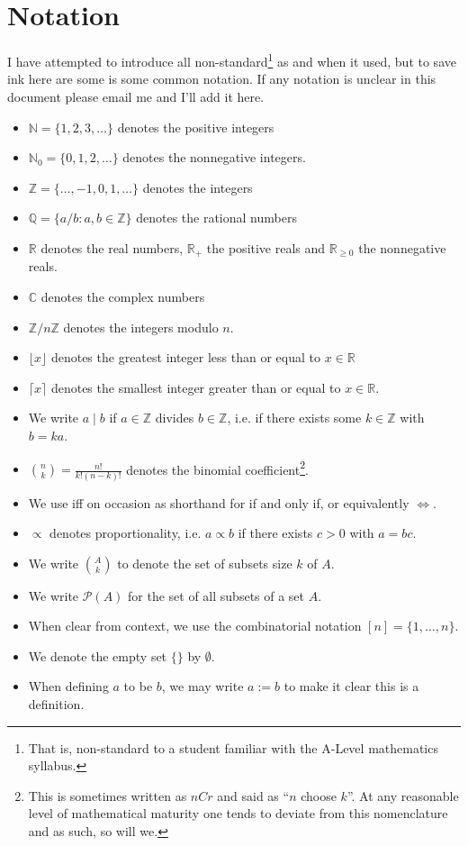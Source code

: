 \documentclass[11pt]{article}
\theoremstyle{definition}
\begin{document}
\tableofcontents

\newpage

\section{Notation}

I have attempted to introduce all non-standard\footnote{
  That is, non-standard to a student familiar with the A-Level mathematics syllabus. 
} as and when it used, but to save ink here are some is some common notation. If any notation is unclear in this 
document please email me and I'll add it here. 
\begin{itemize}
  \item $\mathbb{N} = \{1, 2, 3, \dots\}$ denotes the positive integers 
  \item $\mathbb{N}_0 = \{0, 1, 2, \dots\}$ denotes the nonnegative integers. 
  \item $\mathbb{Z} = \{\dots, -1, 0, 1, \dots\}$ denotes the integers 
  \item $\mathbb{Q} = \{a/b : a, b \in \mathbb{Z}\}$ denotes the rational numbers 
  \item $\mathbb{R}$ denotes the real numbers, $\mathbb{R}_+$ the positive reals and $\mathbb{R}_{\geq 0}$ the 
  nonnegative reals. 
  \item $\mathbb{C}$ denotes the complex numbers 
  \item $\mathbb{Z}/n\mathbb{Z}$ denotes the integers modulo $n$. 
  \item $\lfloor x \rfloor$ denotes the greatest integer less than or equal to $x \in \mathbb{R}$ 
  \item $\lceil x \rceil$ denotes the smallest integer greater than or equal to $x \in \mathbb{R}$. 
  \item We write $a \mid b$ if $a \in \mathbb{Z}$ divides $b \in \mathbb{Z}$, i.e. if there exists some $k \in \mathbb{Z}$ 
  with $b = ka$. 
  \item $\binom{n}{k} = \frac{n!}{k!(n-k)!}$ denotes the binomial coefficient\footnote{This is sometimes 
  written as $nCr$ and said as ``$n$ choose $k$''. At any reasonable level of mathematical maturity one tends to 
  deviate from this nomenclature and as such, so will we.}.
  \item We use iff on occasion as shorthand for if and only if, or equivalently $\Leftrightarrow$.
  \item $\propto$ denotes proportionality, i.e. $a \propto b$ if there exists $c > 0$ with $a = bc$.
  \item We write $\binom{A}{k}$ to denote the set of subsets size $k$ of $A$. 
  \item We write $\mathcal{P}(A)$ for the set of all subsets of a set $A$.
  \item When clear from context, we use the combinatorial notation $[n] = \{1, \dots, n\}$.
  \item We denote the empty set $\{\}$ by $\emptyset$. 
  \item When defining $a$ to be $b$, we may write $a := b$ to make it clear this is a definition. 
\end{itemize}
\end{document}
